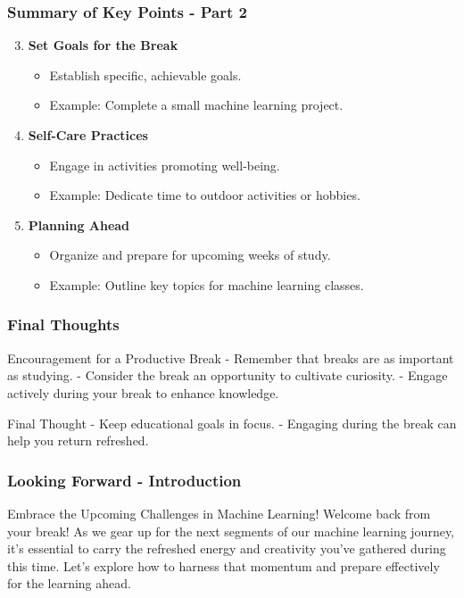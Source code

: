 \documentclass[aspectratio=169]{beamer}
\begin{document}
\begin{frame}[fragile]
  \frametitle{Summary of Key Points - Part 2}
  \begin{enumerate}
    \setcounter{enumi}{2} %
    \item \textbf{Set Goals for the Break} 
    \begin{itemize}
      \item Establish specific, achievable goals.
      \item Example: Complete a small machine learning project.
    \end{itemize}

    \item \textbf{Self-Care Practices} 
    \begin{itemize}
      \item Engage in activities promoting well-being.
      \item Example: Dedicate time to outdoor activities or hobbies.
    \end{itemize}

    \item \textbf{Planning Ahead} 
    \begin{itemize}
      \item Organize and prepare for upcoming weeks of study.
      \item Example: Outline key topics for machine learning classes.
    \end{itemize}
  \end{enumerate}
\end{frame}

\begin{frame}[fragile]
  \frametitle{Final Thoughts}

  \begin{block}{Encouragement for a Productive Break}
    - Remember that breaks are as important as studying.
    - Consider the break an opportunity to cultivate curiosity.
    - Engage actively during your break to enhance knowledge.
  \end{block}

  \begin{block}{Final Thought}
    - Keep educational goals in focus.
    - Engaging during the break can help you return refreshed.
  \end{block}
\end{frame}

\begin{frame}[fragile]
  \frametitle{Looking Forward - Introduction}
  \begin{block}{Embrace the Upcoming Challenges in Machine Learning!}
    Welcome back from your break! As we gear up for the next segments of our machine learning journey, it's essential to carry the refreshed energy and creativity you’ve gathered during this time. Let's explore how to harness that momentum and prepare effectively for the learning ahead.
  \end{block}
\end{frame}
\end{document}
